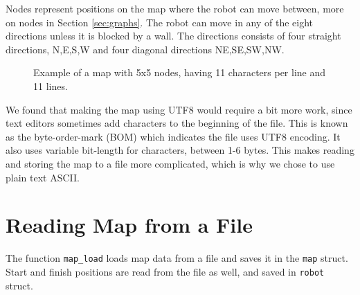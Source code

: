 Nodes represent positions on the map where the robot can move between, more on nodes in Section \ref{sec:graphs}. 
The robot can move in any of the eight directions unless it is blocked by a wall. 
The directions consists of four straight directions, N,E,S,W and four diagonal directions NE,SE,SW,NW. 
\begin{figure}[htp]
    \centering
    \hspace{0.2\textwidth}
    \caption{Example of a map with 5x5 nodes, having 11 characters per line and 11 lines.}
    \label{fig:5x5map}
\end{figure}

We found that making the map using UTF8 would require a bit more work, 
since text editors sometimes add characters to the beginning of the file. 
This is known as the byte-order-mark (BOM) which indicates the file uses UTF8 encoding. 
It also uses variable bit-length for characters, between 1-6 bytes.
This makes reading and storing the map to a file more complicated, which is why we chose to use plain text ASCII.

\newpage
\section{Reading Map from a File}
\label{sec:map_read} %
The function {\tt map\_load} loads map data from a file and saves it in the {\tt map} struct.
Start and finish positions are read from the file as well, and saved in {\tt robot} struct.

